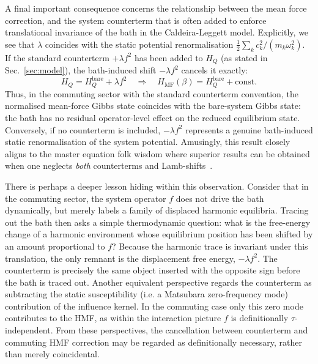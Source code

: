 \documentclass[aps,prl,twocolumn,superscriptaddress,showpacs,floatfix]{revtex4-2}
\begin{document}
A final important consequence concerns the relationship between the mean force correction, and the system counterterm that is often added to enforce translational invariance of the bath in the Caldeira-Leggett model. Explicitly, we see that $\lambda$ coincides with the static potential renormalisation $\frac{1}{2}\sum_k c_k^2/(m_k\omega_k^2)$. If the standard counterterm $+\lambda f^2$ has been added to $H_Q$ (as stated in Sec.~\ref{sec:model}), the bath-induced shift $-\lambda f^2$ cancels it exactly:
\begin{equation}
    H_Q = H_Q^{\mathrm{bare}}+\lambda f^2
    \quad\Longrightarrow\quad
    H_{\mathrm{MF}}(\beta)=H_Q^{\mathrm{bare}}+\mathrm{const}.
    \label{eq:counterterm_cancellation}
\end{equation}
Thus, in the commuting sector with the standard counterterm convention, the normalised mean-force Gibbs state coincides with the bare-system Gibbs state: the bath has no residual operator-level effect on the reduced equilibrium state. Conversely, if no counterterm is included, $-\lambda f^2$ represents a genuine bath-induced static renormalisation of the system potential. Amusingly, this result closely aligns to the master equation folk wisdom where superior results can be obtained when one neglects \emph{both} counterterms and Lamb-shifts~\cite{correaPotentialRenormalisationLamb2025}. 

There is perhaps a deeper lesson hiding within this observation.  Consider that in the commuting sector, the system operator $f$ does not drive the bath dynamically, but merely labels a family of displaced harmonic equilibria. Tracing out the bath then asks a simple thermodynamic question: what is the free-energy change of a harmonic environment whose equilibrium position has been shifted by an amount proportional to $f$? Because the harmonic trace is invariant under this translation, the only remnant is the displacement free energy, $-\lambda f^2$. The counterterm is precisely the same object inserted with the opposite sign before the bath is traced out. Another equivalent perspective regards the counterterm as subtracting the static susceptibility (i.e. a Matsubara zero-frequency mode) contribution of the influence kernel. In the commuting case only this zero mode contributes to the HMF, as within the interaction picture $f$ is definitionally $\tau$-independent. From these perspectives, the cancellation between counterterm and commuting HMF correction may be regarded as definitionally necessary, rather than merely coincidental.
\end{document}

